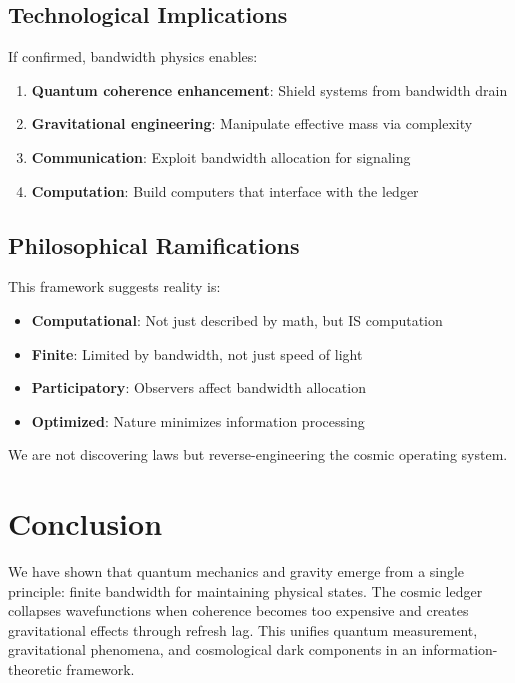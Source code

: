 \documentclass[twocolumn,prd,amsmath,amssymb,aps,superscriptaddress,nofootinbib]{revtex4-2}
\begin{document}
\subsection{Technological Implications}

If confirmed, bandwidth physics enables:

\begin{enumerate}
\item \textbf{Quantum coherence enhancement}: Shield systems from bandwidth drain
\item \textbf{Gravitational engineering}: Manipulate effective mass via complexity
\item \textbf{Communication}: Exploit bandwidth allocation for signaling
\item \textbf{Computation}: Build computers that interface with the ledger
\end{enumerate}

\subsection{Philosophical Ramifications}

This framework suggests reality is:
\begin{itemize}
\item \textbf{Computational}: Not just described by math, but IS computation
\item \textbf{Finite}: Limited by bandwidth, not just speed of light
\item \textbf{Participatory}: Observers affect bandwidth allocation
\item \textbf{Optimized}: Nature minimizes information processing
\end{itemize}

We are not discovering laws but reverse-engineering the cosmic operating system.

\section{Conclusion}
\label{sec:conclusion}

We have shown that quantum mechanics and gravity emerge from a single principle: finite bandwidth for maintaining physical states. The cosmic ledger collapses wavefunctions when coherence becomes too expensive and creates gravitational effects through refresh lag. This unifies quantum measurement, gravitational phenomena, and cosmological dark components in an information-theoretic framework.
\end{document}
